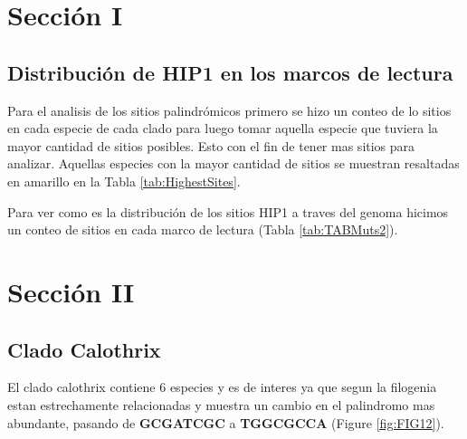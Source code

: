 \documentclass[
]{book}
\begin{document}
\hypertarget{secciuxf3n-i}{%
\chapter*{Sección I}\label{secciuxf3n-i}}

\hypertarget{distribuciuxf3n-de-hip1-en-los-marcos-de-lectura}{%
\section{Distribución de HIP1 en los marcos de lectura}\label{distribuciuxf3n-de-hip1-en-los-marcos-de-lectura}}

Para el analisis de los sitios palindrómicos primero se hizo un conteo de lo sitios en cada especie de cada clado para luego tomar aquella especie que tuviera la mayor cantidad de sitios posibles. Esto con el fin de tener mas sitios para analizar. Aquellas especies con la mayor cantidad de sitios se muestran resaltadas en amarillo en la Tabla \ref{tab:HighestSites}.

Para ver como es la distribución de los sitios HIP1 a traves del genoma hicimos un conteo de sitios en cada marco de lectura (Tabla \ref{tab:TABMuts2}).

\hypertarget{secciuxf3n-ii}{%
\chapter*{Sección II}\label{secciuxf3n-ii}}

\hypertarget{clado-calothrix}{%
\section{Clado Calothrix}\label{clado-calothrix}}

El clado calothrix contiene 6 especies y es de interes ya que segun la filogenia estan estrechamente relacionadas y muestra un cambio en el palindromo mas abundante, pasando de \textbf{GCGATCGC} a \textbf{TGGCGCCA} (Figure \ref{fig:FIG12}).
\end{document}
